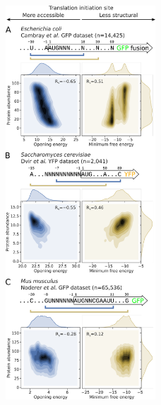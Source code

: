 \begin{figure}
	\includegraphics[width=0.5\textwidth]{chapters/TIsigner/Figs/fig1.png}

\end{figure}

